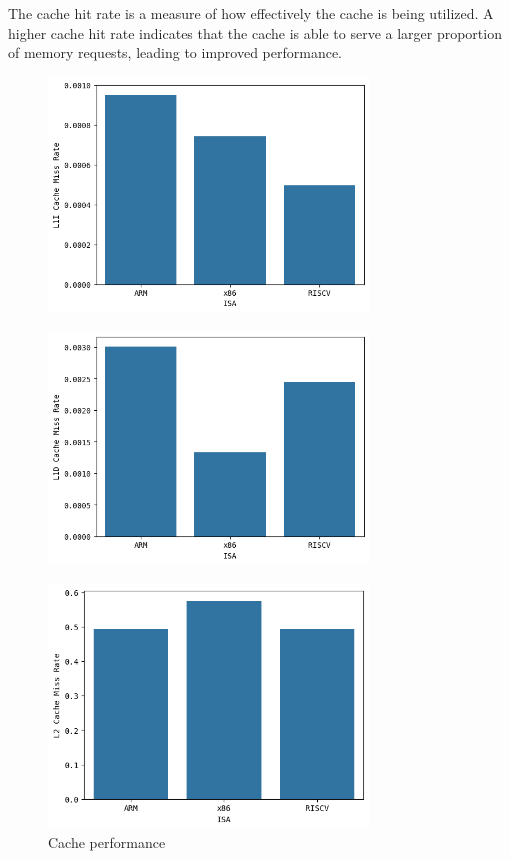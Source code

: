 The cache hit rate is a measure of how effectively the cache is being utilized. A higher cache hit rate indicates that the cache is able to serve a larger proportion of memory requests, leading to improved performance.
\begin{figure}[H]
	\centering
	\includegraphics[width=8.5cm]{figs/l1i.png}
	\label{fig:l1i_cache}
\end{figure}
\begin{figure}[H]
	\centering
	\includegraphics[width=8.5cm]{figs/l1d.png}
	\label{fig:lid_cache}
\end{figure}
\begin{figure}[H]
	\centering
	\includegraphics[width=8.5cm]{figs/l2.png}
	\caption{Cache performance}
	\label{fig:l2_cache}
\end{figure}

